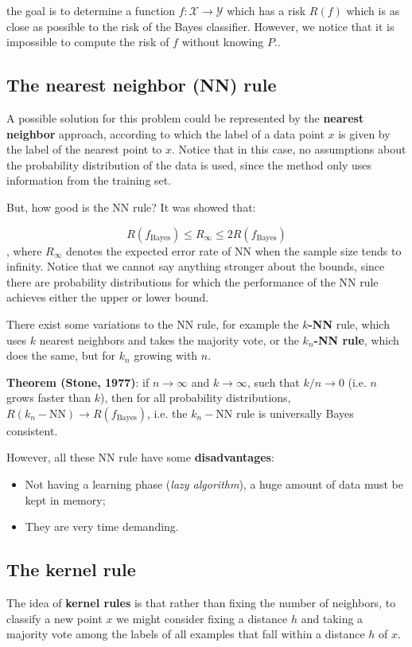 the goal is to determine a function $f: \mathcal{X} \to \mathcal{Y}$ which has a risk $R(f)$ which is as close as possible to the risk of the Bayes classifier. However, we notice that it is impossible to compute the risk of $f$ without knowing $P$..

\subsection{The nearest neighbor (NN) rule} A possible solution for this problem could be represented by the \textbf{nearest neighbor} approach, according to which the label of a data point $x$ is given by the label of the nearest point to $x$. Notice that in this case, no assumptions about the probability distribution of the data is used, since the method only uses information from the training set.

But, how good is the NN rule? It was showed that:

$$
R(f_{\text{Bayes}}) \leq R_{\infty} \leq 2R(f_{\text{Bayes}})
$$
, where $R_{\infty}$ denotes the expected error rate of NN when the sample size tends to infinity. Notice that we cannot say anything stronger about the bounds, since there are probability distributions for which the performance of the NN rule achieves either the upper or lower bound.

There exist some variations to the NN rule, for example the \textbf{$k$-NN} rule, which uses $k$ nearest neighbors and takes the majority vote, or the \textbf{$k_n$-NN rule}, which does the same, but for $k_n$ growing with $n$.

\textbf{Theorem (Stone, 1977)}: if $n \to \infty$ and $k \to \infty$, such that $k/n \to 0$ (i.e. $n$ grows faster than $k$), then for all probability distributions, $R(k_n - \text{NN}) \to R(f_\text{Bayes})$, i.e. the $k_n - \text{NN}$ rule is universally Bayes consistent.

However, all these NN rule have some \textbf{disadvantages}:

\begin{itemize}
    \item Not having a learning phase (\textit{lazy algorithm}), a huge amount of data must be kept in memory;
    \item They are very time demanding.
\end{itemize}

\subsection{The kernel rule}
The idea of \textbf{kernel rules} is that rather than fixing the number of neighbors, to classify a new point $x$ we might consider fixing a distance $h$ and taking a majority vote among the labels of all examples that fall within a distance $h$ of $x$. 

